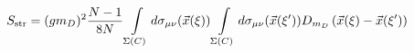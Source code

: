 \begin{equation}
\label{snonloc}
S_{\rm str}=(gm_D)^2\frac{N-1}{8N}\int\limits_{\Sigma(C)}^{}d\sigma_{\mu\nu}(\vec x(\xi))
\int\limits_{\Sigma(C)}^{}d\sigma_{\mu\nu}(\vec x(\xi'))D_{m_D}\left(\vec x(\xi)-\vec x(\xi')\right)
\end{equation}

